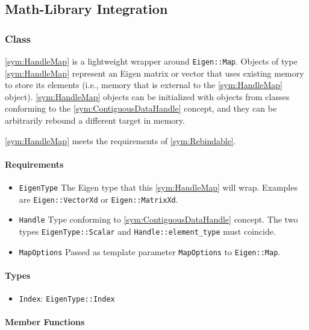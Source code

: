 \subsection{Math-Library Integration}

\subsubsection[Class HandleMap]{Class }

\ref{sym:HandleMap} is a lightweight wrapper around \texttt{Eigen::Map}. Objects of type \ref{sym:HandleMap} represent an Eigen matrix or vector that uses existing memory to store its elements (i.e., memory that is external to the \ref{sym:HandleMap} object). \ref{sym:HandleMap} objects can be initialized with objects from classes conforming to the \ref{sym:ContiguousDataHandle} concept, and they can be arbitrarily rebound a different target in memory.

\ref{sym:HandleMap} meets the requirements of \ref{sym:Rebindable}.

\paragraph{Requirements}

\begin{itemize}
	\item \texttt{EigenType} The Eigen type that this \ref{sym:HandleMap} will wrap. Examples are \texttt{Eigen::VectorXd} or \texttt{Eigen::MatrixXd}.
	\item \texttt{Handle} Type conforming to \ref{sym:ContiguousDataHandle} concept. The two types \texttt{EigenType::Scalar} and \texttt{Handle::element\_type} must coincide.
	\item \texttt{MapOptions} Passed as template parameter \texttt{MapOptions} to \texttt{Eigen::Map}.
\end{itemize}

\paragraph{Types}

\begin{itemize}
	\item \texttt{Index}: \texttt{EigenType::Index}
\end{itemize}

\paragraph{Member Functions}

